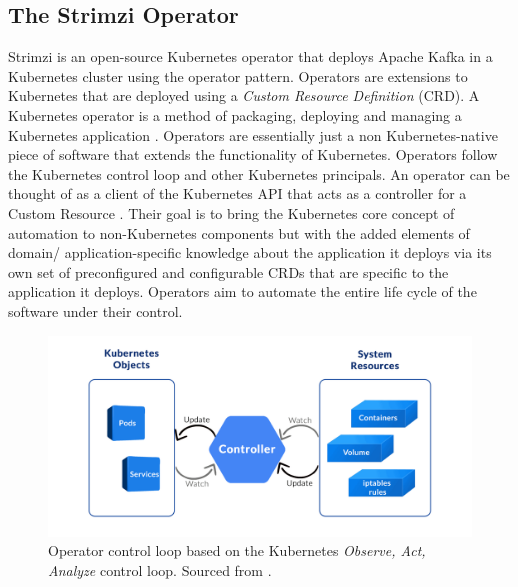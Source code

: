 \begin{flushleft}
	\subsection{The Strimzi Operator}
	Strimzi is an open-source Kubernetes operator that deploys Apache Kafka in a Kubernetes cluster using the operator pattern. \newline
	Operators are extensions to Kubernetes that are deployed using a \emph{Custom Resource Definition} (CRD). A Kubernetes operator is a method of packaging, deploying and
	managing a Kubernetes application \autocite{WhatKubernetesOperator}. Operators are essentially just a non Kubernetes-native piece of software that extends the functionality of Kubernetes.
	Operators follow the Kubernetes control	loop and other Kubernetes principals. An operator can be thought of as a client of the Kubernetes API that acts as a controller
	for a Custom Resource \autocite{OperatorPattern}. Their goal is to bring the Kubernetes core concept of automation to non-Kubernetes components but with the added elements
	of domain/ application-specific knowledge about the application it deploys via its own set of preconfigured and configurable CRDs that are specific to the application it deploys.
	Operators aim to automate the entire life cycle of the software under their control.
	\begin{figure}[ht]
		\begin{center}
			\includegraphics[width=.8\textwidth]{figures/operator_control_loop.png}
			\caption{Operator control loop based on the Kubernetes \emph{Observe, Act, Analyze} control loop. Sourced from \autocite{KubernetesOperatorStateful2021}.}
			\label{fig: 1.3}
		\end{center}
	\end{figure}
	\pagebreak
\end{flushleft}
